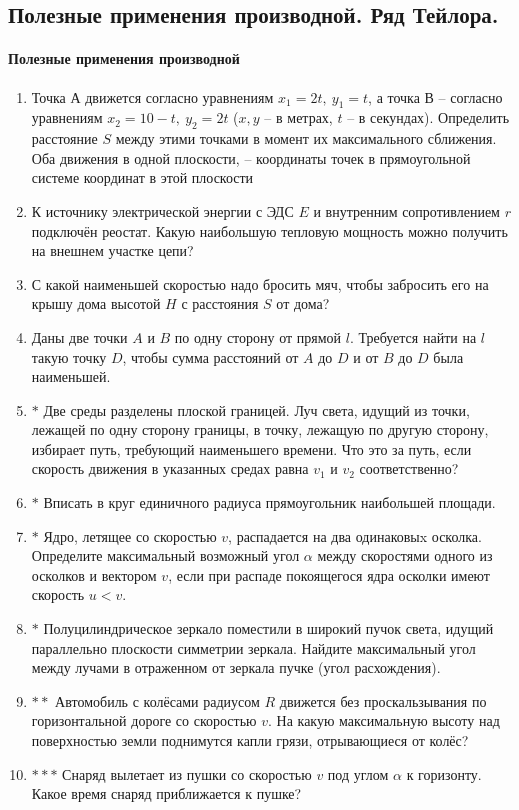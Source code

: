 \subsection*{Полезные применения производной. Ряд Тейлора.}
\paragraph{Полезные применения производной}
\begin{enumerate}
    \item Точка А движется согласно уравнениям $x_1 = 2t,\ y_1 = t$, а точка В – согласно уравнениям $x_2 = 10-t,\ y_2 = 2t$ ($x, y$ – в метрах, $t$ – в секундах). Определить расстояние $S$ между этими точками в момент их максимального сближения. Оба движения в одной плоскости,  – координаты точек в прямоугольной системе координат в этой плоскости
    \item К источнику электрической энергии с ЭДС $E$ и внутренним сопротивлением $r$ подключён реостат. Какую наибольшую тепловую мощность можно получить на внешнем участке цепи?
    \item С какой наименьшей скоростью надо бросить мяч, чтобы забросить его на крышу дома высотой $H$ с расстояния $S$ от дома?
    \item Даны две точки $A$ и $B$ по одну сторону от прямой $l$. Требуется найти на $l$ такую точку $D$, чтобы сумма расстояний от $A$ до $D$ и от $B$ до $D$ была наименьшей.
    \item $\boldsymbol{*}$ Две среды разделены плоской границей. Луч света, идущий из точки, лежащей по одну сторону границы, в точку, лежащую по другую сторону, избирает путь, требующий наименьшего времени. Что это за путь, если скорость движения в указанных средах равна $v_1$ и $v_2$ соответственно?
    \item $\boldsymbol{*}$ Вписать в круг единичного радиуса прямоугольник наибольшей площади.
    \item $\boldsymbol{*}$ Ядро, летящее со скоростью $v$, распадается на два одинаковыx осколка. Определите максимальный возможный угол $\alpha$ между скоростями одного из осколков и вектором $v$, если при распаде покоящегося ядра осколки имеют скорость $u<v$.
    \item $\boldsymbol{*}$ Полуцилиндрическое зеркало поместили в широкий пучок света, идущий параллельно плоскости симметрии зеркала. Найдите максимальный угол между лучами в отраженном от зеркала пучке (угол расхождения).
    \item $\boldsymbol{**}$ Автомобиль с колёсами радиусом $R$ движется без проскальзывания по горизонтальной дороге со скоростью $v$. На какую максимальную высоту над поверхностью земли поднимутся капли грязи, отрывающиеся от колёс?
    \item $\boldsymbol{***}$ Снаряд вылетает из пушки со скоростью $v$ под углом $\alpha$ к горизонту. Какое время снаряд приближается к пушке?
\end{enumerate}
